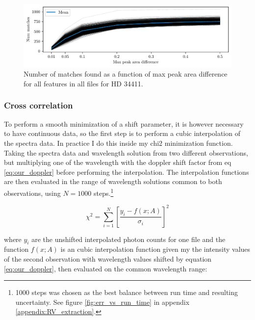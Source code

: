     \begin{figure}%
        \begin{wide}  
            \includegraphics[width=\textwidth]{figures/max_peak_area_diff_vs_Nmatches.pdf}
            \caption{Number of matches found as a function of max peak area difference for all features in all files for HD 34411.}
            \label{fig:max_area_diff_vs_n_matches}
        \end{wide}
    \end{figure}




    \subsubsection{Cross correlation}

    To perform a smooth minimization of a shift parameter, it is however necessary to have continuous data, so the first step is to perform a cubic interpolation of the spectra data. In practice I do this inside my chi2 minimization function. Taking the spectra data and wavelength solution from two different observations, but multiplying one of the wavelength with the doppler shift factor from eq \ref{eq:our_doppler} before performing the interpolation. The interpolation functions are then evaluated in the range of wavelength solutions common to both observations, using $N=1000$ steps.\footnote{1000 steps was chosen as the best balance between run time and resulting uncertainty. See figure \ref{fig:err_vs_run_time} in appendix \ref{appendix:RV_extraction}. } 
    
    \begin{equation}
        \label{eq:shift_fit_chi2}
        \chi^{2}=\sum_{i=1}^{N}\left[\frac{y_{i}-f(x; A)}{\sigma_{i}}\right]^{2}
    \end{equation}
    
    where $y_i$ are the unshifted interpolated photon counts for one file and the function $f(x; A)$ is an cubic interpolation function given my the intensity values of the second observation with wavelength values shifted by equation \ref{eq:our_doppler}, then evaluated on the common wavelength range:
    
